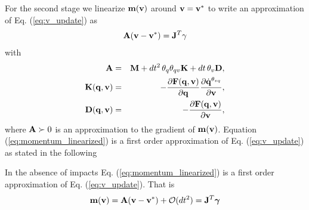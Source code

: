 For the second stage we linearize ${\mathbf{m}}({\mathbf{v}})$ around ${\mathbf{v}} = {\mathbf{v}}^*$ to write an approximation of Eq. (\ref{eq:v_update}) as
\begin{eqnarray}
	\mf{A}(\mf{v}-\mf{v}^*)= \mf{J}^T\mf{\gamma}
	\label{eq:momentum_linearized}
\end{eqnarray}
with
\begin{eqnarray}
	\mf{A}&=&\mf{M}+dt^2\,\theta_q\theta_{qv}\mf{K}+dt\,\theta_v\mf{D},
	\label{eq:expression_for_A}\\
	\mf{K}(\mf{q}, \mf{v})&=&-\frac{\partial \mf{F}(\mf{q}, \mf{v})}{\partial
	\mf{q}}\frac{\partial\dot{\mf{q}}^{\theta_{vq}}}{\partial\mf{v}},\\
		\mf{D}(\mf{q}, \mf{v})&=&-\frac{\partial \mf{F}(\mf{q},
		\mf{v})}{\partial \mf{v}},
		\label{eq:dissipation_matrix}
\end{eqnarray}
where ${\mathbf{A}} \succ 0$ is an approximation to the gradient of ${\mathbf{m}}({\mathbf{v}})$. Equation (\ref{eq:momentum_linearized}) is a first order approximation of Eq. (\ref{eq:v_update}) as stated in the following
\begin{theorem}	
	In the absence of impacts Eq. (\ref{eq:momentum_linearized}) is a first
	order approximation of Eq. (\ref{eq:v_update}). That is
	\begin{eqnarray}
		{\mathbf{m}}({\mathbf{v}}) = {\mathbf{A}}({\mathbf{v}}-{\mathbf{v}}^*) + \mathcal{O}(dt^2) =
		{\mathbf{J}}^T{\mathbf{{\bm\gamma}}}
	\end{eqnarray}
\end{theorem}

